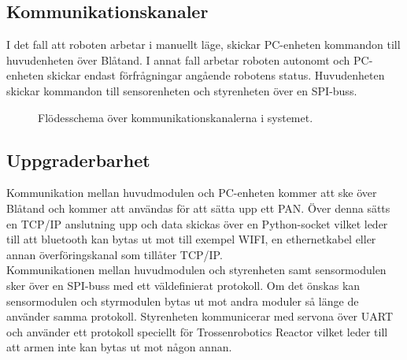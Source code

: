 \subsection{Kommunikationskanaler}
I det fall att roboten arbetar i manuellt läge, skickar PC-enheten kommandon till huvudenheten över Blåtand. I annat fall arbetar roboten autonomt och PC-enheten skickar endast förfrågningar angående robotens status. Huvudenheten skickar kommandon till sensorenheten och styrenheten över en SPI-buss.

\begin{figure}[h]
\center
\scalebox{0.6}{}
\caption{Flödesschema över kommunikationskanalerna i systemet.}
\end{figure}

\subsection{Uppgraderbarhet}
Kommunikation mellan huvudmodulen och PC-enheten kommer att ske över Blåtand och kommer att användas för att sätta upp ett PAN. Över denna sätts en TCP/IP anslutning upp och data skickas över en Python-socket vilket leder till att bluetooth kan bytas ut mot till exempel WIFI, en ethernetkabel eller annan överföringskanal som tillåter TCP/IP. \\
Kommunikationen mellan huvudmodulen och styrenheten samt sensormodulen sker över en SPI-buss med ett väldefinierat protokoll. Om det önskas kan sensormodulen och styrmodulen bytas ut mot andra moduler så länge de använder samma protokoll. Styrenheten kommunicerar med servona över UART och använder ett protokoll speciellt för Trossenrobotics Reactor vilket leder till att armen inte kan bytas ut mot någon annan.
